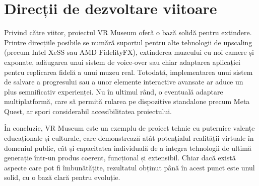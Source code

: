\section{Direcții de dezvoltare viitoare}
Privind către viitor, proiectul VR Museum oferă o bază solidă pentru extindere. Printre direcțiile posibile se numără suportul pentru alte tehnologii de upscaling (precum Intel XeSS sau AMD FidelityFX), extinderea muzeului cu noi camere și exponate, adăugarea unui sistem de voice-over sau chiar adaptarea aplicației pentru replicarea fidelă a unui muzeu real. Totodată, implementarea unui sistem de salvare a progresului sau a unor elemente interactive avansate ar aduce un plus semnificativ experienței. Nu în ultimul rând, o eventuală adaptare multiplatformă, care să permită rularea pe dispozitive standalone precum Meta Quest, ar spori considerabil accesibilitatea proiectului.

În concluzie, VR Museum este un exemplu de proiect tehnic cu puternice valențe educaționale și culturale, care demonstrează atât potențialul realității virtuale în domeniul public, cât și capacitatea individuală de a integra tehnologii de ultimă generație într-un produs coerent, funcțional și extensibil. Chiar dacă există aspecte care pot fi îmbunătățite, rezultatul obținut până în acest punct este unul solid, cu o bază clară pentru evoluție.
